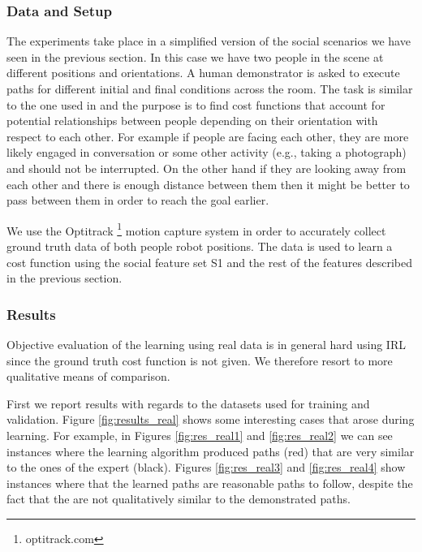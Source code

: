 \documentclass{article}  %
\begin{document}
	\subsubsection{Data and Setup}
	The experiments take place in a simplified version of the social scenarios we have seen in the previous section. In this case we have two people in the scene at different positions and orientations. A human demonstrator is asked to execute paths for different initial and final conditions across the room. The task is similar to the one used in \cite{okallearning} and the purpose is to find cost functions that account for potential relationships between people depending on their orientation with respect to each other. For example if people are facing each other, they are more likely engaged in conversation or some other activity (e.g., taking a photograph) and should not be interrupted. On the other hand if they are looking away from each other and there is enough distance between them then it might be better to pass between them in order to reach the goal earlier.

	We use the Optitrack \footnote{optitrack.com} motion capture system in order to accurately collect ground truth data of both people robot positions. The data is used to learn a cost function using the social feature set S1 and the rest of the features described in the previous section.
	\subsubsection{Results}
	Objective evaluation of the learning using real data is in general hard using IRL since the ground truth cost function is not given. We therefore resort to more qualitative means of comparison. 

	First we report results with regards to the datasets used for training and validation. Figure \ref{fig:results_real}  shows some interesting cases that arose during learning. For example, in Figures \ref{fig:res_real1} and \ref{fig:res_real2}   we can see instances where the learning algorithm produced paths (red) that are very similar to the ones of the expert (black). Figures \ref{fig:res_real3} and \ref{fig:res_real4} show instances where that the learned paths are reasonable paths to follow, despite the fact that the are not qualitatively similar to the demonstrated paths.
\end{document}
